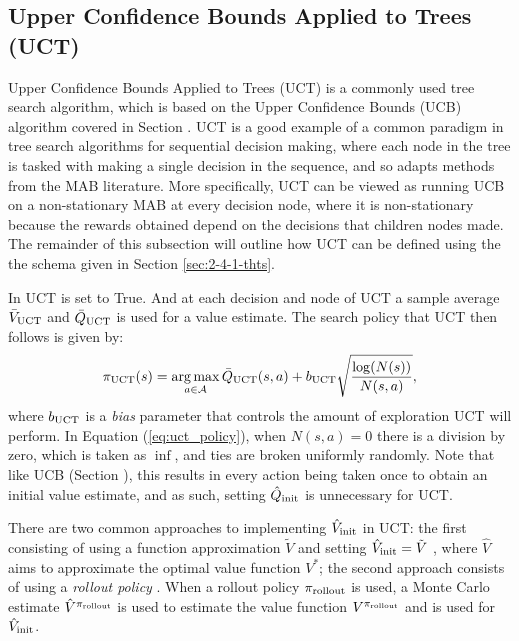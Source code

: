     



    
    \subsection{Upper Confidence Bounds Applied to Trees (UCT)}
    \label{sec:2-4-2-uct}

        Upper Confidence Bounds Applied to Trees (UCT) \cite{uct,uct_long} is a commonly used tree search algorithm, which is based on the Upper Confidence Bounds (UCB)  algorithm covered in Section . UCT is a good example of a common paradigm in tree search algorithms for sequential decision making, where each node in the tree is tasked with making a single decision in the sequence, and so adapts methods from the MAB literature. More specifically, UCT can be viewed as running UCB on a non-stationary MAB at every decision node, where it is non-stationary because the rewards obtained depend on the decisions that children nodes made. The remainder of this subsection will outline how UCT can be defined using the the \thtspp schema given in Section \ref{sec:2-4-1-thts}.

        In UCT \mctsmode\ewe is set to True. And at each decision and node of UCT a sample average ${\bar{V}_{{\textnormal{UCT}}}}$ and ${\bar{Q}_{{\textnormal{UCT}}}}$ is used for a value estimate. The search policy that UCT then follows is given by:
        \begin{align}
            {\pi_{{\textnormal{UCT}}}}(s) = \operatorname*{arg\,max}_{a\in\mathcal{A}} {\bar{Q}_{{\textnormal{UCT}}}}(s,a) + b_{{\textnormal{UCT}}} \sqrt{\frac{\log(N(s))}{N(s,a)}}, \label{eq:uct_policy}
        \end{align}
        where $b_{{\textnormal{UCT}}}$ is a \textit{bias} parameter that controls the amount of exploration UCT will perform. In Equation (\ref{eq:uct_policy}), when $N(s,a)=0$ there is a division by zero, which is taken as $\inf$, and ties are broken uniformly randomly. Note that like UCB (Section ), this results in every action being taken once to obtain an initial value estimate, and as such, setting ${\hat{Q}_{\textnormal{init}}}$ is unnecessary for UCT.   
        
        There are two common approaches to implementing ${\hat{V}_{\textnormal{init}}}$ in UCT: the first consisting of using a function approximation $\tilde{V}$ and setting ${\hat{V}_{\textnormal{init}}}=\tilde{V}$ , where $\hat{V}$ aims to approximate the optimal value function $V^*$; the second approach consists of using a \textit{rollout policy} . When a rollout policy ${\pi_{{\textnormal{rollout}}}}$ is used, a Monte Carlo estimate $\hat{V}^{{\pi_{{\textnormal{rollout}}}}}$ is used to estimate the value function $V^{{\pi_{{\textnormal{rollout}}}}}$ and is used for ${\hat{V}_{\textnormal{init}}}$.

